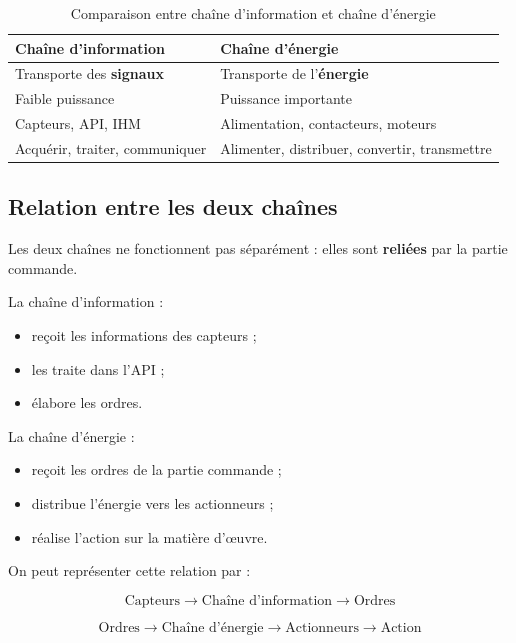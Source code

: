 \begin{table}[h]
\centering
\begin{tabularx}{\textwidth}{|X|X|}
\hline
\textbf{Chaîne d'information} & \textbf{Chaîne d'énergie} \\
\hline
Transporte des \textbf{signaux} & Transporte de l'\textbf{énergie} \\
\hline
Faible puissance & Puissance importante \\
\hline
Capteurs, API, IHM & Alimentation, contacteurs, moteurs \\
\hline
Acquérir, traiter, communiquer & Alimenter, distribuer, convertir, transmettre \\
\hline
\end{tabularx}
\caption{Comparaison entre chaîne d'information et chaîne d'énergie}
\end{table}

\subsection{Relation entre les deux chaînes}

Les deux chaînes ne fonctionnent pas séparément : elles sont \textbf{reliées} par la partie commande.

La chaîne d'information :

\begin{itemize}
    \item reçoit les informations des capteurs ;
    \item les traite dans l'API ;
    \item élabore les ordres.
\end{itemize}

La chaîne d'énergie :

\begin{itemize}
    \item reçoit les ordres de la partie commande ;
    \item distribue l'énergie vers les actionneurs ;
    \item réalise l'action sur la matière d'œuvre.
\end{itemize}

On peut représenter cette relation par :

\[
\text{Capteurs} \rightarrow \text{Chaîne d'information} \rightarrow \text{Ordres}
\]

\[
\text{Ordres} \rightarrow \text{Chaîne d'énergie} \rightarrow \text{Actionneurs} \rightarrow \text{Action}
\]


